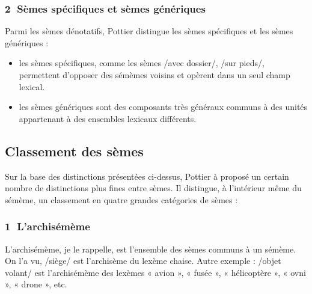 \subsubsection*{\textcircled{\scriptsize 2} Sèmes spécifiques et sèmes génériques}
Parmi les sèmes dénotatifs, Pottier distingue les sèmes spécifiques et les sèmes génériques :
\begin{itemize}
\item les sèmes spécifiques, comme les sèmes /avec dossier/, /sur pieds/, permettent d’opposer des sémèmes voisins et opèrent dans un seul champ lexical.
\item les sèmes génériques sont des composants très généraux communs à des unités appartenant à des ensembles lexicaux différents.
\end{itemize}

\subsection{Classement des sèmes}
Sur la base des distinctions présentées ci-dessus, Pottier à proposé un certain nombre de distinctions plus fines entre sèmes. Il distingue, à l’intérieur même du sémème, un classement en quatre grandes catégories de sèmes :

\subsubsection*{\textcircled{\scriptsize 1} L’archisémème}
L’archisémème, je le rappelle, est l’ensemble des sèmes communs à un sémème. On l’a vu, /siège/ est l’archisème du lexème chaise. Autre exemple : /objet volant/ est l’archisémème des lexèmes « avion », « fusée », « hélicoptère », « ovni », « drone », etc.

